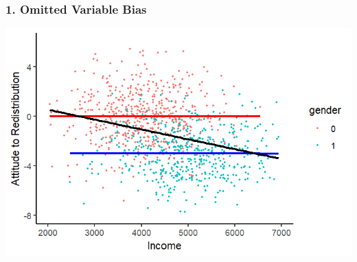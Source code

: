 \documentclass[xcolor=x11names,compress]{beamer}\usepackage[]{graphicx}\usepackage[]{color}
\makeatletter
\def\maxwidth{ %
  \ifdim\Gin@nat@width>\linewidth
    \linewidth
  \else
    \Gin@nat@width
  \fi
}
\newenvironment{knitrout}{}{} %
\renewcommand{\(}{\begin{columns}}
\renewcommand{\)}{\end{columns}}
\newcommand{\<}[1]{\begin{column}{#1}}
\renewcommand{\>}{\end{column}}
\makeatother
\begin{document}
\begin{frame}
\frametitle{1. Omitted Variable Bias}
\begin{knitrout}
\color{fgcolor}
\includegraphics[width=\maxwidth]{figure/confound3-1} 

\end{knitrout}
\end{frame}
\end{document}
